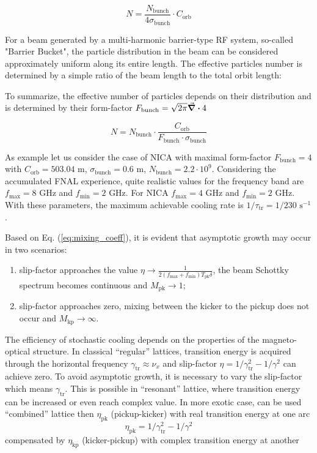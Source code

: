 \documentclass[submitting]{nst}
\begin{document}
	\begin{equation}
		N=\frac{N_{\textrm{bunch}}}{{4\sigma}_{\textrm{bunch}}}\cdot C_{\textrm{orb}}
	\end{equation}
	
	\noindent For a beam generated by a multi-harmonic barrier-type RF system, so-called "Barrier Bucket", the particle distribution in the beam can be considered approximately uniform along its entire length. The effective particles number is determined by a simple ratio of the beam length to the total orbit length:
	
	\noindent To summarize, the effective number of particles depends on their distribution and is determined by their form-factor $F_{\text{bunch}}=\sqrt{2\pi}\divisionsymbol4$
	
	\begin{equation}
		N=N_{\textrm{bunch}}\cdot\frac{C_{\textrm{orb}}}{F_{\textrm{bunch}}\cdot\sigma_{\textrm{bunch}}}
	\end{equation}
	
	As example let us consider the case of NICA with maximal form-factor $F_{\text{bunch}}=4$ with $C_{\text{orb}}=503.04$ m, $\sigma_{\text{bunch}}=0.6$ m, $N_{\text{bunch}}=2.2\cdot{10}^9$. Considering the accumulated FNAL \cite{b8} experience, quite realistic values for the frequency band are $f_{\text{max}}=8$ GHz and $f_{\text{min}}=2$ GHz. For NICA $f_{\text{max}}=4$ GHz and $f_{\text{min}}=2$ GHz. With these parameters, the maximum achievable cooling rate is $1/\tau_{\text{tr}}=1/230$ $\text{s}^{-1}$.
	
	
	\par Based on Eq. (\ref{eq:mixing_coeff}), it is evident that asymptotic growth may occur in two scenarios:
	\begin{enumerate}
		\item slip-factor approaches the value $\eta\rightarrow\frac{1}{2\left(f_{\text{max}}+f_{\text{min}}\right)T_{\text{pk}}\delta}$, the beam Schottky spectrum becomes continuous and $M_{\text{pk}}\rightarrow1$;
		\item slip-factor approaches zero, mixing between the kicker to the pickup does not occur and $M_{\text{kp}}\rightarrow\infty$.
	\end{enumerate}
	\noindent The efficiency of stochastic cooling depends on the properties of the magneto-optical structure. In classical “regular” lattices, transition energy is acquired through the horizontal frequency $\gamma_{\text{tr}}\approx\nu_x$ and slip-factor $\eta=1/\gamma_{\text{tr}}^2-1/\gamma^2$ can achieve zero. To avoid asymptotic growth, it is necessary to vary the slip-factor which means $\gamma_{\text{tr}}$. This is possible in “resonant” lattice, where transition energy can be increased or even reach complex value. In more exotic case, can be used “combined” lattice then $\eta_{\text{pk}}$ (pickup-kicker) with real transition energy at one arc
	\begin{equation}
		\eta_{\textrm{pk}}=1/\gamma_{\textrm{tr}}^2-1/\gamma^2
		\label{eq:eta_pk}
	\end{equation}
	\noindent compensated by $\eta_{\text{kp}}$ (kicker-pickup) with complex transition energy at another
	
\end{document}
